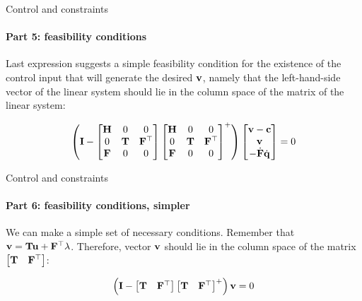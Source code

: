 \documentclass{beamer}
\begin{document}
\begin{frame}{Control and constraints}
\framesubtitle{Part 5: feasibility conditions}
\begin{flushleft}

Last expression suggests a simple feasibility condition for the existence of the control input that will generate the desired $\mathbf{v}$, namely that the left-hand-side vector of the linear system should lie in the column space of the matrix of the linear system:

\begin{equation}
\left(
\mathbf{I} - 
\begin{bmatrix}
        \mathbf{H} & 0 & 0 \\
        0 & \mathbf{T} & \mathbf{F}^\top \\
        \mathbf{F} & 0 & 0 \\
    \end{bmatrix}
    \begin{bmatrix}
        \mathbf{H} & 0 & 0 \\
        0 & \mathbf{T} & \mathbf{F}^\top \\
        \mathbf{F} & 0 & 0 \\
    \end{bmatrix}^+
    \right)
    \begin{bmatrix}
        \mathbf{v} - \mathbf{c} \\
        \mathbf{v} \\
        -\dot{\mathbf{F}} \dot{\mathbf{q}} \\
    \end{bmatrix}  
    = 0
\end{equation}

\end{flushleft}
\end{frame}



\begin{frame}{Control and constraints}
\framesubtitle{Part 6: feasibility conditions, simpler}
\begin{flushleft}

We can make a simple set of necessary conditions. Remember that $\mathbf{v} = \mathbf{T}\mathbf{u} + \mathbf{F}^\top \lambda$. Therefore, vector $\mathbf{v}$ should lie in the column space of the matrix $\begin{bmatrix} \mathbf{T} & \mathbf{F}^\top \end{bmatrix}$:

\begin{equation}
\left(
\mathbf{I} - 
\begin{bmatrix} \mathbf{T} & \mathbf{F}^\top \end{bmatrix}
\begin{bmatrix} \mathbf{T} & \mathbf{F}^\top \end{bmatrix}^+
    \right)
\mathbf{v}
    = 0
\end{equation}

\end{flushleft}
\end{frame}
\end{document}
